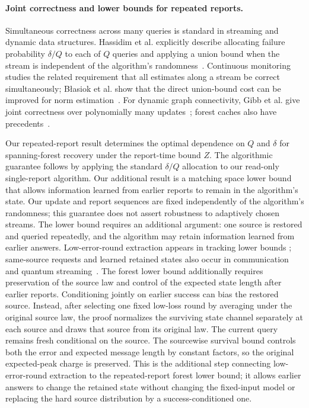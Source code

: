 \documentclass[11pt,letterpaper]{article}
\numberwithin{equation}{section}
\begin{document}
\paragraph{Joint correctness and lower bounds for repeated reports.}
Simultaneous correctness across many queries is standard in streaming and dynamic data structures.
Hassidim et al. explicitly describe allocating failure probability $\delta/Q$ to each of $Q$ queries and applying a union bound when the stream is independent of the algorithm's randomness~\cite[Introduction]{HassidimEtAl2020Robust}.
Continuous monitoring studies the related requirement that all estimates along a stream be correct simultaneously; B{\l}asiok et al. show that the direct union-bound cost can be improved for norm estimation~\cite[Definition~1 and Introduction]{BlasiokDingNelson2017Monitoring}.
For dynamic graph connectivity, Gibb et al. give joint correctness over polynomially many updates~\cite[Theorem~3.1]{GibbKapronKingThorn2015}; forest caches also have precedents~\cite{TenchEtAl2025Landscape}.

Our repeated-report result determines the optimal dependence on $Q$ and $\delta$ for spanning-forest recovery under the report-time bound $Z$.
The algorithmic guarantee follows by applying the standard $\delta/Q$ allocation to our read-only single-report algorithm.
Our additional result is a matching space lower bound that allows information learned from earlier reports to remain in the algorithm's state.
Our update and report sequences are fixed independently of the algorithm's randomness; this guarantee does not assert robustness to adaptively chosen streams.
The lower bound requires an additional argument: one source is restored and queried repeatedly, and the algorithm may retain information learned from earlier answers.
Low-error-round extraction appears in tracking lower bounds \cite[Section~7 of the full version]{Blasiok2018}; same-source requests and learned retained states also occur in communication and quantum streaming~\cite{GilboaJainMcClean2025,Voronova2026Replenishment}.
The forest lower bound additionally requires preservation of the source law and control of the expected state length after earlier reports.
Conditioning jointly on earlier success can bias the restored source.
Instead, after selecting one fixed low-loss round by averaging under the original source law, the proof normalizes the surviving state channel separately at each source and draws that source from its original law.
The current query remains fresh conditional on the source.
The sourcewise survival bound controls both the error and expected message length by constant factors, so the original expected-peak charge is preserved.
This is the additional step connecting low-error-round extraction to the repeated-report forest lower bound; it allows earlier answers to change the retained state without changing the fixed-input model or replacing the hard source distribution by a success-conditioned one.
\end{document}
